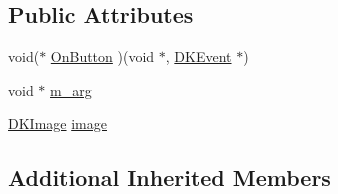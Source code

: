 \subsection*{Public Attributes}
\begin{DoxyCompactItemize}
\item 
void($\ast$ \hyperlink{class_d_k_button_ab66f2da0f50ca9691e36a88c17ac942a}{On\-Button} )(void $\ast$, \hyperlink{class_d_k_event}{D\-K\-Event} $\ast$)
\item 
void $\ast$ \hyperlink{class_d_k_button_a00f0135dcaa5a1244cd7032a7b6996d7}{m\-\_\-arg}
\item 
\hyperlink{class_d_k_image}{D\-K\-Image} \hyperlink{class_d_k_button_ad6720b491cb15049c94653dc225ae2ec}{image}
\end{DoxyCompactItemize}
\subsection*{Additional Inherited Members}


